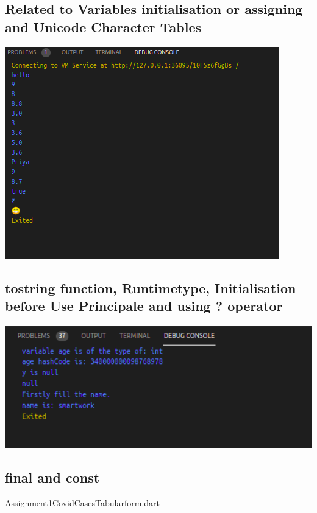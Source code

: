 \subsection{Related to Variables initialisation or assigning and Unicode Character Tables}

\includegraphics{dart/Output1.png}\\[0.5cm]

\subsection{tostring function, Runtimetype, Initialisation before Use Principale and using ? operator }

\includegraphics[width=16cm]{dart/initialisationOutput.png}\\[0.5cm]
\subsection{final and const}Assignment1CovidCasesTabularform.dart

